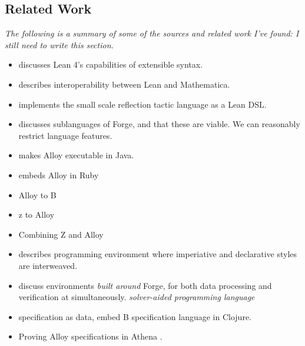 \subsection{Related Work}\label{sec:bg-related}
\emph{The following is a summary of some of the sources and related work I've found: I still need to write this section.}
\begin{itemize}
    \item \cite{ullrich2022beyond} discusses Lean 4's capabilities of extensible syntax. 
    \item \cite{lewis2022bi} describes interoperability between Lean and Mathematica. 
    \item \cite{gladshtein2024small} implements the small scale reflection tactic language as a Lean DSL. 
    \item \cite{ngpdbccdlrrvwwk-oopsla-2024} discusses sublanguages of Forge, and that these are viable. We can reasonably restrict language features. 
    \item \cite{milicevic2010executable} makes Alloy executable in Java. 
    \item \cite{milicevic2014alpha} embeds Alloy in Ruby
    \item \cite{krings2018translation} Alloy to B 
    \item \cite{malik2010translating} z to Alloy
    \item \cite{mikhailov2002approach} Combining Z and Alloy
    \item \cite{milicevic2015advancing} describes programming environment where imperiative and declarative styles are interweaved. 
    \item \cite{st2023comparison} discuss environments \emph{built around} Forge, for both data processing and verification at simultaneously. \emph{solver-aided programming language}
    \item \cite{korner2022embedding} specification as data, embed B specification language in Clojure. 
    \item \cite{arkoudas2004integrating} Proving Alloy specifications in Athena \cite{arkoudas2000denotational,musser2003proving}.
\end{itemize}
